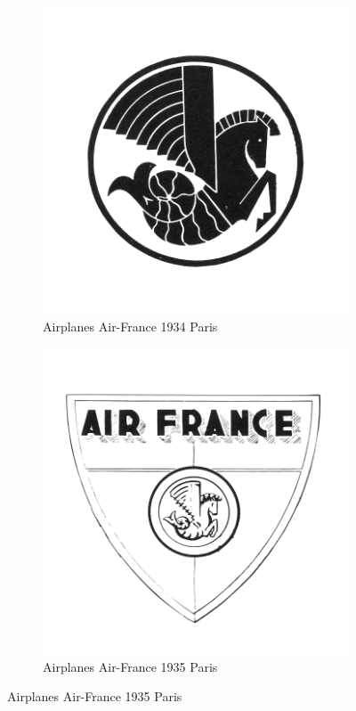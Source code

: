 \begin{figure}[h]
  \begin{subfigure}{.45\textwidth}
    \centering
    \includegraphics[width=.5\linewidth]{images/supplement/trademarks/french/4_16}
    \caption[]{Airplanes Air-France 1934 Paris}
    \label{fig:trademarks:french:4.16}
  \end{subfigure}\hfill
  \begin{subfigure}{.45\textwidth}
    \centering
    \includegraphics[width=.5\linewidth]{images/supplement/trademarks/french/4_17}
    \caption[]{Airplanes Air-France 1935 Paris}
    \label{fig:trademarks:french:4.17}
  \end{subfigure}


\end{figure}
